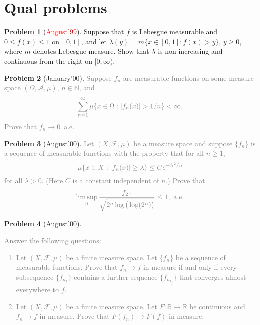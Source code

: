\documentclass[12pt]{amsart}
\def\field#1{\mathbb{#1}}
\def\abs#1{\lvert {#1} \rvert}
\theoremstyle{definition}
\newtheorem{problem}{Problem}
\theoremstyle{remark}
\begin{document}
\section{Qual problems}
\begin{problem}[\textcolor{red}{August'99}]
  Suppose that $f$ is Lebesgue measurable and $0 \leq f(x) \leq 1$ on
  $[0,1]$, and let $\lambda(y) = m\{ x \in [0,1] : f(x) > y \}$, $y
  \geq 0$, where $m$ denotes Lebesgue measure. Show that $\lambda$ is
  non-increasing and continuous from the right on $[0,\infty)$.
\end{problem}
\begin{problem}[\textcolor{gray!65!red}{January'00}]
  \textcolor{gray}{Suppose $f_n$ are measurable functions on some
    measure space $(\Omega, \mathcal{A}, \mu)$, $n \in \field{N}$,
    and}
  \begin{equation*}
    \textcolor{gray}{ \sum_{n=1}^\infty \mu\{ x \in \Omega :
    \abs{f_n(x)} > 1/n \} < \infty.}
  \end{equation*}
  \textcolor{gray}{Prove that $f_n \to 0$~a.e.}
\end{problem}
\begin{problem}[\textcolor{gray!65!red}{August'00}]
  \textcolor{gray}{ Let $(X, \mathcal{F}, \mu)$ be a measure space and
    suppose $\{ f_n \}$ is a sequence of measurable functions with the
    property that for all $n \geq 1$,}
  \begin{equation*}
    \textcolor{gray}{ \mu \{ x \in X : \abs{f_n(x)} \geq \lambda \}
    \leq Ce^{-\lambda^2/n} }
  \end{equation*}
  \textcolor{gray}{for all $\lambda > 0$. (Here $C$ is a constant
    independent of $n$.)  Prove that}
  \begin{equation*}
    \textcolor{gray}{\limsup_n \frac{f_{2^n}}{\sqrt{2^n \log\big( \log
    (2^n)\big)}} \leq 1,~\text{a.e.}}
  \end{equation*}
\end{problem}
\begin{problem}[\textcolor{gray!65!red}{August'00}]
  \textcolor{gray}{ Answer the following questions:
    \begin{enumerate}
    \item Let $(X, \mathcal{F}, \mu)$ be a finite measure space.  Let
      $\{ f_n \}$ be a sequence of measurable functions.  Prove that
      $f_n \to f$ in measure if and only if every subsequence $\{
      f_{n_k} \}$ contains a further sequence $\{ f_{n_{k_j}} \}$ that
      converges almost everywhere to $f$.
    \item Let $(X, \mathcal{F}, \mu)$ be a finite measure space.  Let
      $F \colon \field{R} \to \field{R}$ be continuous and $f_n \to f$
      in measure.  Prove that $F(f_n) \to F(f)$ in measure.
    \end{enumerate}}
\end{problem}
\end{document}
